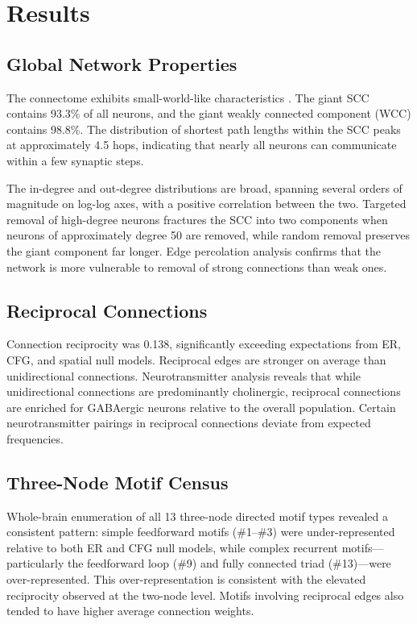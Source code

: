 \documentclass[11pt]{article}
\begin{document}
\section{Results}

\subsection{Global Network Properties}

The connectome exhibits small-world-like characteristics \citep{watts1998collective}. The giant SCC contains 93.3\% of all neurons, and the giant weakly connected component (WCC) contains 98.8\%. The distribution of shortest path lengths within the SCC peaks at approximately 4.5 hops, indicating that nearly all neurons can communicate within a few synaptic steps.

The in-degree and out-degree distributions are broad, spanning several orders of magnitude on log-log axes, with a positive correlation between the two. Targeted removal of high-degree neurons fractures the SCC into two components when neurons of approximately degree 50 are removed, while random removal preserves the giant component far longer. Edge percolation analysis confirms that the network is more vulnerable to removal of strong connections than weak ones.

\subsection{Reciprocal Connections}

Connection reciprocity was 0.138, significantly exceeding expectations from ER, CFG, and spatial null models. Reciprocal edges are stronger on average than unidirectional connections. Neurotransmitter analysis reveals that while unidirectional connections are predominantly cholinergic, reciprocal connections are enriched for GABAergic neurons relative to the overall population. Certain neurotransmitter pairings in reciprocal connections deviate from expected frequencies.

\subsection{Three-Node Motif Census}

Whole-brain enumeration of all 13 three-node directed motif types revealed a consistent pattern: simple feedforward motifs (\#1--\#3) were under-represented relative to both ER and CFG null models, while complex recurrent motifs---particularly the feedforward loop (\#9) and fully connected triad (\#13)---were over-represented. This over-representation is consistent with the elevated reciprocity observed at the two-node level. Motifs involving reciprocal edges also tended to have higher average connection weights.
\end{document}
